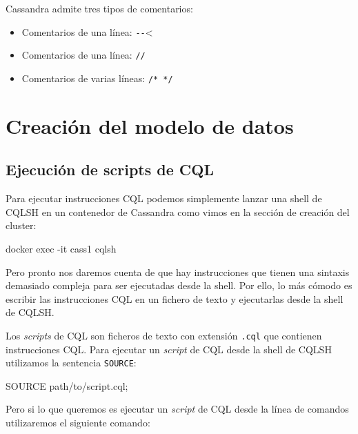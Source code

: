 \documentclass[
]{book}
\newenvironment{Shaded}{}{}
\newcommand{\AttributeTok}[1]{\textcolor[rgb]{0.49,0.56,0.16}{#1}}
\newcommand{\ExtensionTok}[1]{#1}
\newcommand{\NormalTok}[1]{#1}
\providecommand{\tightlist}{%
  \setlength{\itemsep}{0pt}\setlength{\parskip}{0pt}}
\begin{document}
Cassandra admite tres tipos de comentarios:

\begin{itemize}
\tightlist
\item
  Comentarios de una línea: \texttt{-\/-}\textless{}
\item
  Comentarios de una línea: \texttt{//}
\item
  Comentarios de varias líneas: \texttt{/*\ */}
\end{itemize}

\section{Creación del modelo de datos}\label{creaciuxf3n-del-modelo-de-datos}

\subsection{Ejecución de scripts de CQL}\label{ejecuciuxf3n-de-scripts-de-cql}

Para ejecutar instrucciones CQL podemos simplemente lanzar una shell de CQLSH en un contenedor de Cassandra como vimos en la sección de creación del cluster:

\begin{Shaded}
\begin{Highlighting}[]
\ExtensionTok{docker}\NormalTok{ exec }\AttributeTok{{-}it}\NormalTok{ cass1 cqlsh}
\end{Highlighting}
\end{Shaded}

Pero pronto nos daremos cuenta de que hay instrucciones que tienen una sintaxis demasiado compleja para ser ejecutadas desde la shell. Por ello, lo más cómodo es escribir las instrucciones CQL en un fichero de texto y ejecutarlas desde la shell de CQLSH.

Los \emph{scripts} de CQL son ficheros de texto con extensión \texttt{.cql} que contienen instrucciones CQL. Para ejecutar un \emph{script} de CQL desde la shell de CQLSH utilizamos la sentencia \texttt{SOURCE}:

\begin{Shaded}
\begin{Highlighting}[]
\NormalTok{SOURCE \textquotesingle{}path/to/script.cql\textquotesingle{};}
\end{Highlighting}
\end{Shaded}

Pero si lo que queremos es ejecutar un \emph{script} de CQL desde la línea de comandos utilizaremos el siguiente comando:
\end{document}
